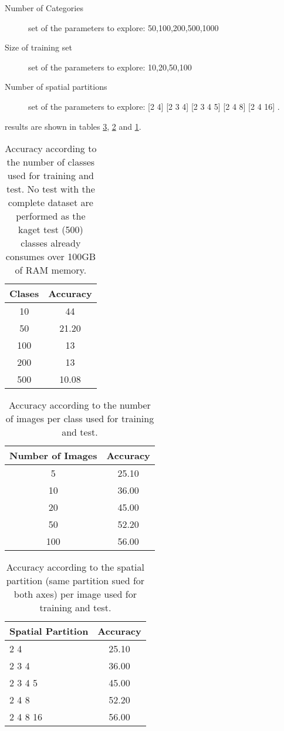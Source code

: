 \documentclass[10pt,twocolumn,letterpaper]{article}
\begin{document}
\begin{description}
\item[Number of Categories] set of the parameters to explore: 50,100,200,500,1000
\item[Size of training set] set of the parameters to explore: 10,20,50,100
\item[Number of spatial partitions] set of the parameters to explore: [2 4]  [2 3 4]  [2 3 4 5]  [2 4 8]  [2 4 16] .
\end{description}

results are shown in tables \ref{table:tableCategories}, \ref{table:tableImages} and \ref{table:tableClases}.

\begin{table}[t]
\centering
\begin{tabular}{c | c }
Clases & Accuracy    \\
\hline	
10 & 44  \\
50 & 21.20 \\
100 & 13 \\
200 & 13 \\
500 & 10.08 \\

\end{tabular}
\caption{Accuracy according to the number of classes used for training and test. No test with the complete dataset are performed as the kaget test (500) classes already consumes over 100GB of RAM memory.
}
\label{table:tableClases}
\end{table}

\begin{table}[t]
\centering
\begin{tabular}{c | c }
Number of Images & Accuracy    \\
\hline	
5 & 25.10  \\
10 & 36.00 \\
20 & 45.00 \\
50 & 52.20 \\
100 & 56.00 \\

\end{tabular}
\caption{Accuracy according to the number of images per class used for training and test.
}
\label{table:tableImages}
\end{table}

\begin{table}[t]
\centering
\begin{tabular}{l | c }
Spatial Partition & Accuracy    \\
\hline	
2 4 & 25.10  \\
2 3 4  & 36.00 \\
2 3 4 5 & 45.00 \\
2 4 8 & 52.20 \\
2 4 8 16 & 56.00 \\

\end{tabular}
\caption{Accuracy according to the spatial partition (same partition sued for both axes) per image used for training and test.
}
\label{table:tableCategories}
\end{table}
\end{document}
